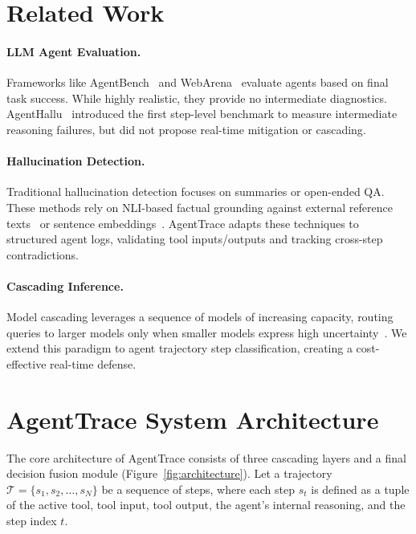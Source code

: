\documentclass[11pt,a4paper]{article}
\begin{document}
\section{Related Work}
\paragraph{LLM Agent Evaluation.} Frameworks like AgentBench~\cite{agentbench2024} and WebArena~\cite{webarena2024} evaluate agents based on final task success. While highly realistic, they provide no intermediate diagnostics. AgentHallu~\cite{agenthallu2026} introduced the first step-level benchmark to measure intermediate reasoning failures, but did not propose real-time mitigation or cascading.

\paragraph{Hallucination Detection.} Traditional hallucination detection focuses on summaries or open-ended QA. These methods rely on NLI-based factual grounding against external reference texts~\cite{deberta2021} or sentence embeddings~\cite{sentencebert2019}. AgentTrace adapts these techniques to structured agent logs, validating tool inputs/outputs and tracking cross-step contradictions.

\paragraph{Cascading Inference.} Model cascading leverages a sequence of models of increasing capacity, routing queries to larger models only when smaller models express high uncertainty~\cite{llmasajudge2023}. We extend this paradigm to agent trajectory step classification, creating a cost-effective real-time defense.

\section{AgentTrace System Architecture}
The core architecture of AgentTrace consists of three cascading layers and a final decision fusion module (Figure~\ref{fig:architecture}). Let a trajectory $\mathcal{T} = \{s_1, s_2, \dots, s_N\}$ be a sequence of steps, where each step $s_t$ is defined as a tuple of the active tool, tool input, tool output, the agent's internal reasoning, and the step index $t$.
\end{document}
